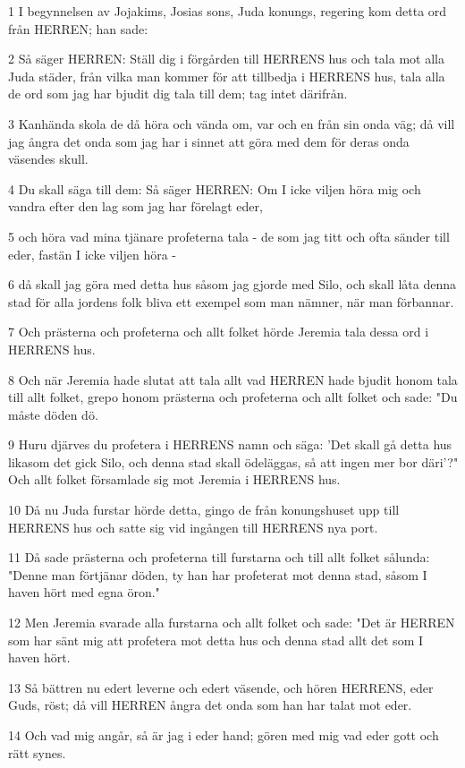 \par 1 I begynnelsen av Jojakims, Josias sons, Juda konungs, regering kom detta ord från HERREN; han sade:
\par 2 Så säger HERREN: Ställ dig i förgården till HERRENS hus och tala mot alla Juda städer, från vilka man kommer för att tillbedja i HERRENS hus, tala alla de ord som jag har bjudit dig tala till dem; tag intet därifrån.
\par 3 Kanhända skola de då höra och vända om, var och en från sin onda väg; då vill jag ångra det onda som jag har i sinnet att göra med dem för deras onda väsendes skull.
\par 4 Du skall säga till dem: Så säger HERREN: Om I icke viljen höra mig och vandra efter den lag som jag har förelagt eder,
\par 5 och höra vad mina tjänare profeterna tala - de som jag titt och ofta sänder till eder, fastän I icke viljen höra -
\par 6 då skall jag göra med detta hus såsom jag gjorde med Silo, och skall låta denna stad för alla jordens folk bliva ett exempel som man nämner, när man förbannar.
\par 7 Och prästerna och profeterna och allt folket hörde Jeremia tala dessa ord i HERRENS hus.
\par 8 Och när Jeremia hade slutat att tala allt vad HERREN hade bjudit honom tala till allt folket, grepo honom prästerna och profeterna och allt folket och sade: "Du måste döden dö.
\par 9 Huru djärves du profetera i HERRENS namn och säga: 'Det skall gå detta hus likasom det gick Silo, och denna stad skall ödeläggas, så att ingen mer bor däri'?" Och allt folket församlade sig mot Jeremia i HERRENS hus.
\par 10 Då nu Juda furstar hörde detta, gingo de från konungshuset upp till HERRENS hus och satte sig vid ingången till HERRENS nya port.
\par 11 Då sade prästerna och profeterna till furstarna och till allt folket sålunda: "Denne man förtjänar döden, ty han har profeterat mot denna stad, såsom I haven hört med egna öron."
\par 12 Men Jeremia svarade alla furstarna och allt folket och sade: "Det är HERREN som har sänt mig att profetera mot detta hus och denna stad allt det som I haven hört.
\par 13 Så bättren nu edert leverne och edert väsende, och hören HERRENS, eder Guds, röst; då vill HERREN ångra det onda som han har talat mot eder.
\par 14 Och vad mig angår, så är jag i eder hand; gören med mig vad eder gott och rätt synes.
